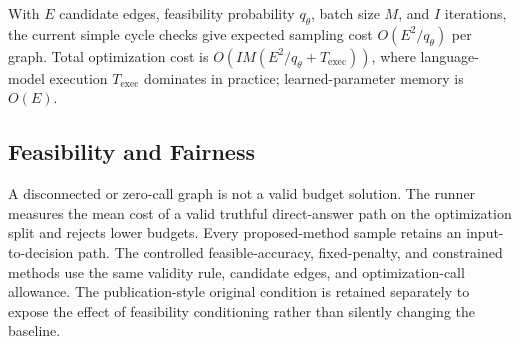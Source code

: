 With $E$ candidate edges, feasibility probability $q_{\theta}$, batch size $M$, and $I$ iterations, the current simple cycle checks give expected sampling cost $O(E^2/q_{\theta})$ per graph. Total optimization cost is $O(IM(E^2/q_{\theta}+T_{\mathrm{exec}}))$, where language-model execution $T_{\mathrm{exec}}$ dominates in practice; learned-parameter memory is $O(E)$.

\subsection{Feasibility and Fairness}

A disconnected or zero-call graph is not a valid budget solution. The runner measures the mean cost of a valid truthful direct-answer path on the optimization split and rejects lower budgets. Every proposed-method sample retains an input-to-decision path. The controlled feasible-accuracy, fixed-penalty, and constrained methods use the same validity rule, candidate edges, and optimization-call allowance. The publication-style original condition is retained separately to expose the effect of feasibility conditioning rather than silently changing the baseline.
